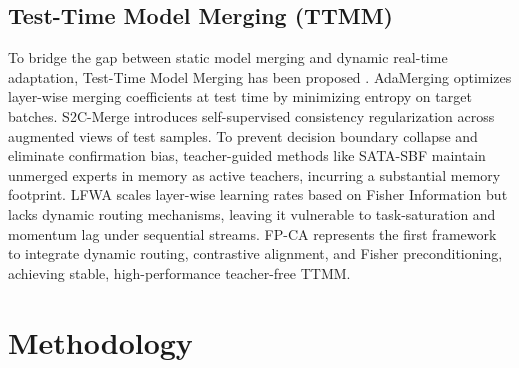 \documentclass{article}
\theoremstyle{plain}
\theoremstyle{definition}
\theoremstyle{remark}
\begin{document}
\subsection{Test-Time Model Merging (TTMM)}
To bridge the gap between static model merging and dynamic real-time adaptation, Test-Time Model Merging has been proposed \cite{yang2024adamerging, anonymous2026s2c, motyka2025heterogeneous, li2024learning, corbeil2025modular, gargiulo2024task, panariello2025accurate, kuo2025exact, du2025adamms}. AdaMerging \cite{yang2024adamerging} optimizes layer-wise merging coefficients at test time by minimizing entropy on target batches. S2C-Merge \cite{anonymous2026s2c} introduces self-supervised consistency regularization across augmented views of test samples. To prevent decision boundary collapse and eliminate confirmation bias, teacher-guided methods like SATA-SBF \cite{anonymous2026sata} maintain unmerged experts in memory as active teachers, incurring a substantial memory footprint. LFWA \cite{anonymous2026lfwa} scales layer-wise learning rates based on Fisher Information but lacks dynamic routing mechanisms, leaving it vulnerable to task-saturation and momentum lag under sequential streams. FP-CA represents the first framework to integrate dynamic routing, contrastive alignment, and Fisher preconditioning, achieving stable, high-performance teacher-free TTMM.

\section{Methodology}
\label{method}
\end{document}
